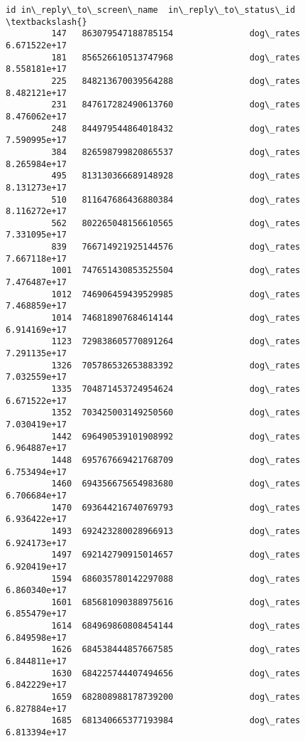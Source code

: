\documentclass[11pt]{article}
\begin{document}
\begin{Verbatim}[commandchars=\\\{\}]
                               id in\_reply\_to\_screen\_name  in\_reply\_to\_status\_id  \textbackslash{}
         147   863079547188785154               dog\_rates           6.671522e+17   
         181   856526610513747968               dog\_rates           8.558181e+17   
         225   848213670039564288               dog\_rates           8.482121e+17   
         231   847617282490613760               dog\_rates           8.476062e+17   
         248   844979544864018432               dog\_rates           7.590995e+17   
         384   826598799820865537               dog\_rates           8.265984e+17   
         495   813130366689148928               dog\_rates           8.131273e+17   
         510   811647686436880384               dog\_rates           8.116272e+17   
         562   802265048156610565               dog\_rates           7.331095e+17   
         839   766714921925144576               dog\_rates           7.667118e+17   
         1001  747651430853525504               dog\_rates           7.476487e+17   
         1012  746906459439529985               dog\_rates           7.468859e+17   
         1014  746818907684614144               dog\_rates           6.914169e+17   
         1123  729838605770891264               dog\_rates           7.291135e+17   
         1326  705786532653883392               dog\_rates           7.032559e+17   
         1335  704871453724954624               dog\_rates           6.671522e+17   
         1352  703425003149250560               dog\_rates           7.030419e+17   
         1442  696490539101908992               dog\_rates           6.964887e+17   
         1448  695767669421768709               dog\_rates           6.753494e+17   
         1460  694356675654983680               dog\_rates           6.706684e+17   
         1470  693644216740769793               dog\_rates           6.936422e+17   
         1493  692423280028966913               dog\_rates           6.924173e+17   
         1497  692142790915014657               dog\_rates           6.920419e+17   
         1594  686035780142297088               dog\_rates           6.860340e+17   
         1601  685681090388975616               dog\_rates           6.855479e+17   
         1614  684969860808454144               dog\_rates           6.849598e+17   
         1626  684538444857667585               dog\_rates           6.844811e+17   
         1630  684225744407494656               dog\_rates           6.842229e+17   
         1659  682808988178739200               dog\_rates           6.827884e+17   
         1685  681340665377193984               dog\_rates           6.813394e+17   

\end{Verbatim}
\end{document}
